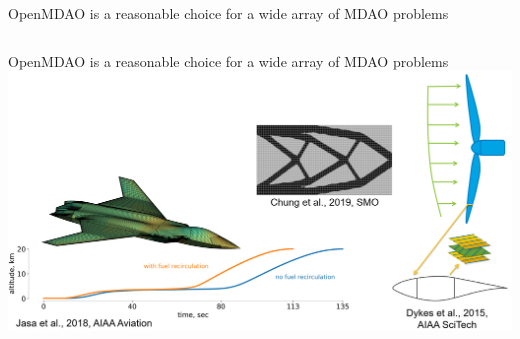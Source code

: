 \documentclass[aspectratio=169, usenames,dvipsnames, 14pt]{beamer}
\begin{document}
\begin{frame}{OpenMDAO is a reasonable choice for a wide array of MDAO problems}
\begin{columns}
    \end{columns}
\end{frame}


\begin{frame}{OpenMDAO is a reasonable choice for a wide array of MDAO problems}
        \includegraphics[scale=.27]{images/combined.png}
\end{frame}

\end{document}
